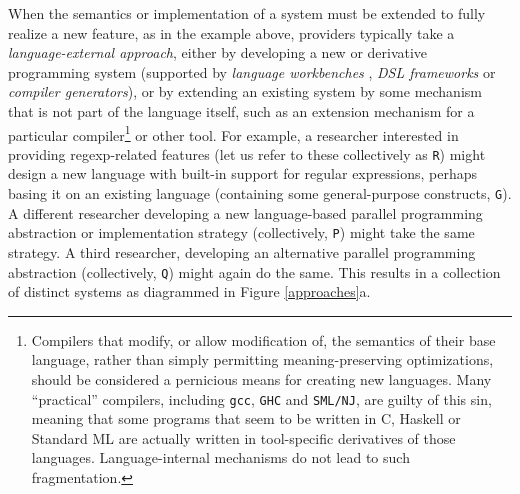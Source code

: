 When the semantics or implementation of a system must be extended to fully realize a new feature, as in the example above, providers typically take a \emph{language-external approach}, either by developing a new or derivative programming system (supported by \emph{language workbenches} \cite{erdweg2013state},  \emph{DSL frameworks} \cite{fowler2010domain} or \emph{compiler generators}), or by extending an existing system by some mechanism that is not part of the language itself, such as an extension mechanism for a {particular} compiler\footnote{Compilers that modify, or allow modification of, the semantics of their base language, rather than simply permitting meaning-preserving optimizations, should be considered a pernicious means for creating new languages. Many ``practical'' compilers, including \texttt{gcc}, \texttt{GHC} and \texttt{SML/NJ}, are guilty of this sin, meaning that some programs that seem to be written in C, Haskell or Standard ML are actually written in tool-specific derivatives of those languages. Language-internal mechanisms do not lead to such fragmentation.} or other tool. For example, a researcher interested in providing regexp-related features (let us refer to these collectively as \texttt{R}) might design a new language with built-in support for regular expressions, perhaps basing it on an existing language (containing some general-purpose constructs, \texttt{G}). A different researcher developing a new language-based parallel programming abstraction or implementation strategy (collectively, \texttt{P}) might  take the same strategy. A third researcher, developing an alternative parallel programming abstraction (collectively, \texttt{Q}) might again do the same. This results in a collection of distinct systems as diagrammed in Figure \ref{approaches}a.%

